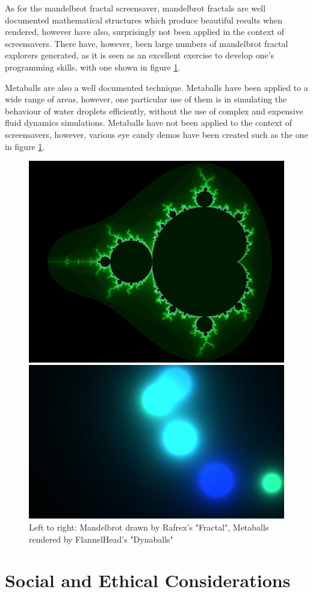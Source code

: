 \documentclass[10pt, openany]{book}
\begin{document}
As for the mandelbrot fractal screensaver, mandelbrot fractals are well documented mathematical structures which produce beautiful results when rendered, however have also, surprisingly not been applied in the context of screensavers. There have, however, been large numbers of mandelbrot fractal explorers generated, as it is seen as an excellent exercise to develop one’s programming skills, with one shown in figure \ref{fig:products}.

Metaballs are also a well documented technique. Metaballs have been applied to a wide range of areas, however, one particular use of them is in simulating the behaviour of water droplets efficiently, without the use of complex and expensive fluid dynamics simulations. Metaballs have not been applied to the context of screensavers, however, various eye candy demos have been created such as the one in figure \ref{fig:products}.

\begin{figure}[H]
\centering
\begin{minipage}{.5\textwidth}
  \centering
  \includegraphics[width=.4\linewidth]{rafrex}  
\end{minipage}%
\begin{minipage}{.5\textwidth}
  \centering
  \includegraphics[width=.4\linewidth]{dynaballs} 
\end{minipage}
\caption[Examples of mandelbrot and metaballs products]{Left to right: Mandelbrot drawn by Rafrex's "Fractal", Metaballs rendered by FlannelHead's "Dynaballs"}
\label{fig:products}
\end{figure}	

\section{Social and Ethical Considerations}
\end{document}
